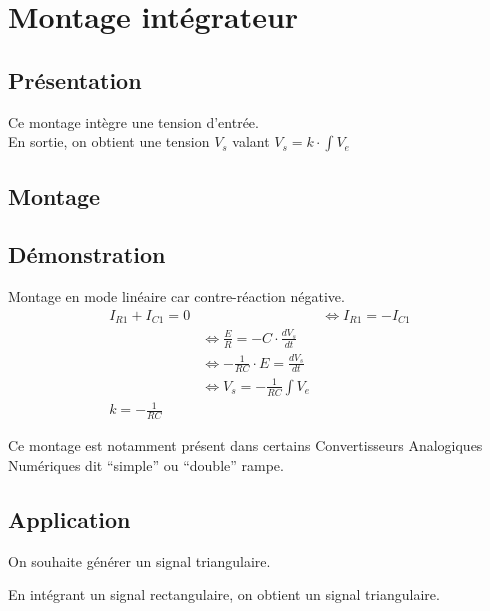 \chapter{Montage intégrateur}
\section{Présentation}
Ce montage intègre une tension d’entrée. \\
En sortie, on obtient une tension $V_s$ valant $V_s=k \cdot \int V_e$

\section{Montage}


\section{Démonstration}

Montage en mode linéaire car contre-réaction négative. \\


\begin{align}
I_{R1} + I_{C1}  = 0 & 
& \Leftrightarrow I_{R1} = -I_{C1} \\
& \Leftrightarrow \frac{E}{R} = - C \cdot \frac{dV_s}{dt} \\
& \Leftrightarrow -\frac{1}{RC}\cdot E = \frac{dV_s}{dt} \\
& \Leftrightarrow V_s = -\frac{1}{RC} \int V_e \\
k=-\frac{1}{RC} &
\end{align}
   
Ce montage est notamment présent dans certains Convertisseurs Analogiques Numériques dit “simple” ou “double” rampe. 


\section{Application}

\begin{exemple}
On souhaite générer un signal triangulaire.
\end{exemple}


En intégrant un signal rectangulaire, on obtient un signal triangulaire.



